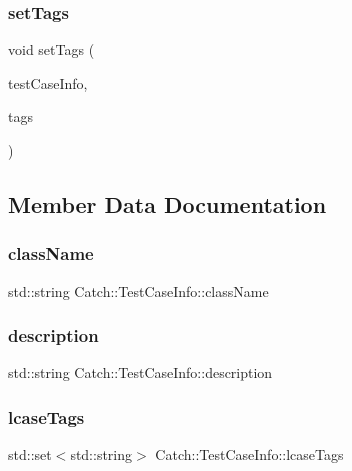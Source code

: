 \subsubsection{set\+Tags}
{\footnotesize\ttfamily void set\+Tags (\begin{DoxyParamCaption}\item[{\textbf{ Test\+Case\+Info} \&}]{test\+Case\+Info,  }\item[{std\+::set$<$ std\+::string $>$ const \&}]{tags }\end{DoxyParamCaption})\hspace{0.3cm}{\ttfamily [friend]}}



\subsection{Member Data Documentation}
\mbox{\label{struct_catch_1_1_test_case_info_a1a5e0825132a38d091defdebbf2f8ce9}} 
\subsubsection{class\+Name}
{\footnotesize\ttfamily std\+::string Catch\+::\+Test\+Case\+Info\+::class\+Name}

\mbox{\label{struct_catch_1_1_test_case_info_a37fe2db9425bc45f6a33893eac31198e}} 
\subsubsection{description}
{\footnotesize\ttfamily std\+::string Catch\+::\+Test\+Case\+Info\+::description}

\mbox{\label{struct_catch_1_1_test_case_info_a0ed3864a313e8ddc3ae38431be5be9ae}} 
\subsubsection{lcase\+Tags}
{\footnotesize\ttfamily std\+::set$<$std\+::string$>$ Catch\+::\+Test\+Case\+Info\+::lcase\+Tags}

